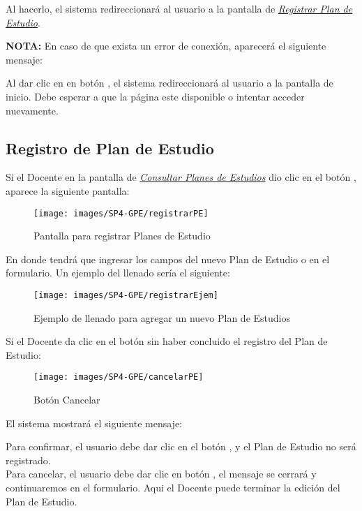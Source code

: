 Al hacerlo, el sistema redireccionará al usuario a la pantalla de \hyperlink{registrarPE}{\textit{Registrar Plan de Estudio}}.


\textbf{NOTA:} En caso de que exista un error de conexión, aparecerá el siguiente mensaje:

Al dar clic en en botón , el sistema redireccionará al usuario a la pantalla de inicio. Debe esperar a que la página este disponible o intentar acceder nuevamente.
\newpage
\subsection{Registro de Plan de Estudio}
Si el Docente en la pantalla de \hyperlink{consultarPE}{\textit{Consultar Planes de Estudios}} dio clic en el botón \IUbutton{+}, aparece la siguiente pantalla:

\begin{figure}[!hbtp]
    \centering
    \hypertarget{registrarPE}{\texttt{[image: images/SP4-GPE/registrarPE]}}
    \caption{Pantalla para registrar Planes de Estudio}
    \label{registrarPE}
\end{figure}
\newpage
En donde tendrá que ingresar los campos del nuevo Plan de Estudio o en el formulario. Un ejemplo del llenado sería el siguiente:

\begin{figure}[!hbtp]
    \centering
    \hypertarget{ejreg}{\texttt{[image: images/SP4-GPE/registrarEjem]}}
    \caption{Ejemplo de llenado para agregar un nuevo Plan de Estudios}
    \label{ejreg}
\end{figure}
\newpage
Si el Docente  da clic en el botón  sin haber concluido el registro del Plan de Estudio:

\begin{figure}[!hbtp]
    \centering
    \hypertarget{cancel2}{\texttt{[image: images/SP4-GPE/cancelarPE]}}
    \caption{Botón Cancelar}
    \label{cancel2}
\end{figure}

El sistema mostrará el siguiente mensaje:

Para confirmar, el usuario debe dar clic en el botón  , y el Plan de Estudio no será registrado.\\

Para cancelar, el usuario debe dar clic en botón  , el mensaje se cerrará y continuaremos en el formulario. Aqui el Docente puede terminar la edición del Plan de Estudio.

